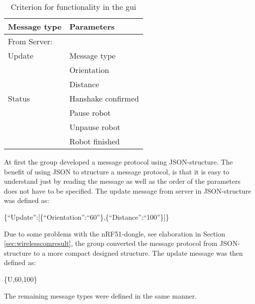\begin{table}[ht]
\begin{center}
 \begin{tabular}{|l | l|} 
 \hline
 Message type       &    Parameters \\
 \hline
 \hline
 From Server: & \\
 \hline
 Update  			&   Message type \\
                    &   Orientation \\
                    &   Distance \\
 \hline
 Status		        &   Hanshake confirmed \\
                    &   Pause robot \\
                    &   Unpause robot \\
                    &   Robot finished \\
 \hline
\end{tabular}
\end{center}
\caption{Criterion for functionality in the \acrshort{gui}}
\label{tab:messprotfromser}
\end{table}

At first the group developed a message protocol using JSON-structure. The benefit of using JSON to structure a message protocol, is that it is easy to understand just by reading the message as well as the order of the parameters does not have to be specified. The update message from server in JSON-structure was defined as:

\{``Update'':[\{``Orientation'':``60''\},\{``Distance'':``100''\}]\}

Due to some problems with the nRF51-dongle, see elaboration in Section \ref{sec:wirelesscomresult}, the group converted the message protocol from JSON-structure to a more compact designed structure. The update message was then defined as:

\{U,60,100\}

The remaining message types were defined in the same manner.